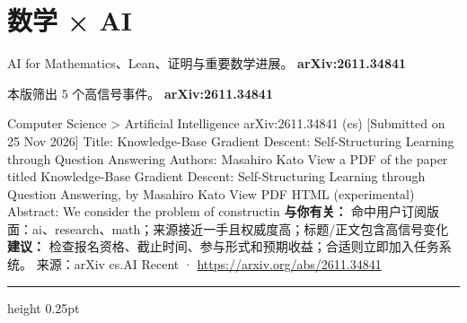\documentclass[10.5pt]{ctexart}
\begin{document}
\section*{数学 × AI}
{\color{ormuted} AI for Mathematics、Lean、证明与重要数学进展。}
\vspace{2mm}
{\LARGE\bfseries arXiv:2611.34841}\par
\vspace{1mm}
{\color{ormuted} 本版筛出 5 个高信号事件。}
\vspace{3mm}
{\Large\bfseries arXiv:2611.34841}\par
Computer Science > Artificial Intelligence arXiv:2611.34841 (cs) [Submitted on 25 Nov 2026] Title: Knowledge-Base Gradient Descent: Self-Structuring Learning through Question Answering Authors: Masahiro Kato View a PDF of the paper titled Knowledge-Base Gradient Descent: Self-Structuring Learning through Question Answering, by Masahiro Kato View PDF HTML (experimental) Abstract: We consider the problem of constructin
\textbf{与你有关：} 命中用户订阅版面：ai、research、math；来源接近一手且权威度高；标题/正文包含高信号变化
\textbf{建议：} 检查报名资格、截止时间、参与形式和预期收益；合适则立即加入任务系统。
{\footnotesize\color{ormuted} 来源：arXiv cs.AI Recent · \url{https://arxiv.org/abs/2611.34841}}
\vspace{4mm}
\hrule height 0.25pt
\vspace{3mm}
\end{document}
